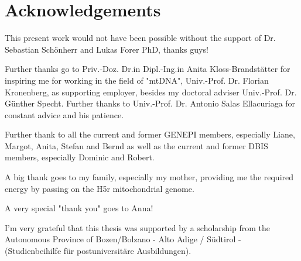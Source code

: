 \section*{Acknowledgements}


This present work would not have been possible without the support of Dr. Sebastian Sch\"onherr and Lukas Forer PhD, thanks guys! 

Further thanks go to Priv.-Doz. Dr.in Dipl.-Ing.in Anita Kloss-Brandst\"atter for inspiring me for working in the field of "mtDNA", Univ.-Prof. Dr. Florian Kronenberg, as supporting employer, besides my doctoral adviser Univ.-Prof. Dr. G\"unther Specht. Further thanks to Univ.-Prof. Dr. Antonio Salas Ellacuriaga for constant advice and his patience.

Further thank to all the current and former GENEPI members, especially Liane, Margot, Anita, Stefan and Bernd as well as the current and former DBIS members, especially Dominic and Robert.

A big thank goes to my family, especially my mother, providing me the required energy by passing on the H5r mitochondrial genome. 

A very special "thank you" goes to Anna! 

I'm very grateful that this thesis was supported by a scholarship from the Autonomous Province of Bozen/Bolzano - Alto Adige / S\"udtirol - (Studienbeihilfe f\"ur postuniversit\"are Ausbildungen). 

 
%
\cleardoublepage
